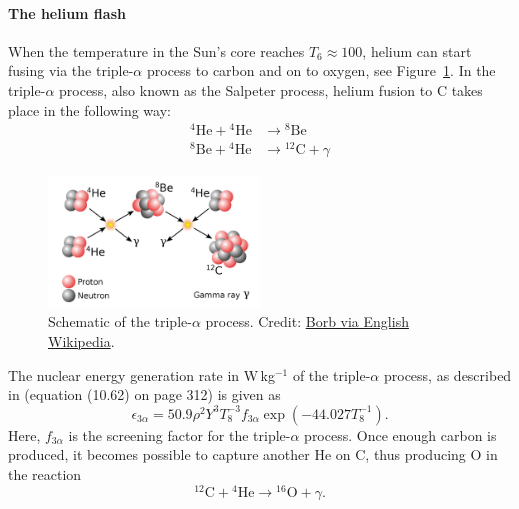 \paragraph{The helium flash}
When the temperature in the Sun's core reaches $T_6 \approx 100$, helium can start fusing via the triple-$\alpha$ process to carbon and on to oxygen, see Figure~\ref{fig:sun:triple_alpha_process}. In the triple-$\alpha$ process, also known as the Salpeter process, helium fusion to C takes place in the following way:
\begin{align}
    {^4}\mathrm{He} + {^4}\mathrm{He} &\longrightarrow {^8}\mathrm{Be}\\
    {^8}\mathrm{Be} + {^4}\mathrm{He} &\longrightarrow {^{12}}\mathrm{C} + \gamma
\end{align}
\begin{figure}[tb]
    \centering
    \includegraphics[width=0.5\textwidth]{graphics/sun/triple_alpha}
    \caption{Schematic of the triple-$\alpha$ process. Credit: \href{https://en.wikipedia.org/wiki/Triple-alpha_process}{Borb via English Wikipedia}.}
    \label{fig:sun:triple_alpha_process}
\end{figure}
The nuclear energy generation rate in W\,kg$^{-1}$ of the triple-$\alpha$ process, as described in \citet{carroll17} (equation (10.62) on page 312) is given as
\begin{equation}
    \epsilon_{3\alpha} = 50.9 \rho^{2} Y^{3} T_8^{-3} f_{3\alpha} \exp\left(-44.027 T_8^{-1}\right). \label{eqn:sun:triple_alpha_energy_generation}
\end{equation}
Here, $f_{3\alpha}$ is the screening factor for the triple-$\alpha$ process. Once enough carbon is produced, it becomes possible to capture another He on C, thus producing O in the reaction
\begin{equation}
    {^{12}}\mathrm{C} + {^4}\mathrm{He} \longrightarrow {^{16}}\mathrm{O} + \gamma.
\end{equation}

